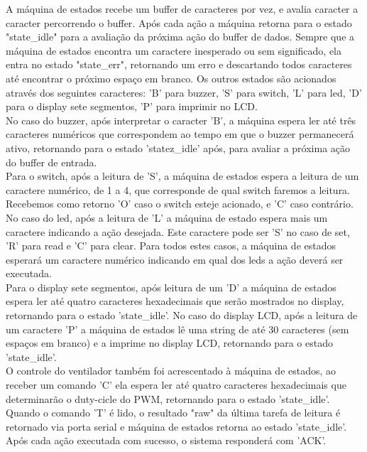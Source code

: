 \documentclass{article}
\begin{document}
A máquina de estados recebe um buffer de caracteres por vez, e avalia caracter a caracter percorrendo o buffer. Após cada ação a máquina retorna para o estado "state\_idle" para a avaliação da próxima ação do buffer de dados. Sempre que a máquina de estados encontra um caractere inesperado ou sem significado, ela entra no estado "state\_err", retornando um erro e descartando todos caracteres até encontrar o próximo espaço em branco. Os outros estados são acionados através dos seguintes caracteres: 'B' para buzzer, 'S' para switch, 'L' para led, 'D' para o display sete segmentos, 'P' para imprimir no LCD.\\
No caso do buzzer,  após interpretar o caracter 'B', a máquina espera ler até três caracteres numéricos que correspondem ao tempo em que o buzzer permanecerá ativo, retornando para o estado 'statez\_idle' após, para avaliar a próxima ação do buffer de entrada.\\
Para o switch, após a leitura de 'S', a máquina de estados espera a leitura de um caractere numérico, de 1 a 4, que corresponde de qual switch faremos a leitura. Recebemos como retorno 'O' caso o switch esteje acionado, e 'C' caso contrário.\\
No caso do led, após a leitura de 'L' a máquina de estado espera mais um caractere indicando a ação desejada. Este caractere pode ser 'S' no caso de set, 'R' para read e 'C' para clear. Para todos estes casos, a máquina de estados esperará um caractere numérico indicando em qual dos leds a ação deverá ser executada.\\
Para o display sete segmentos, após leitura de um 'D' a máquina de estados espera ler até quatro caracteres hexadecimais que serão mostrados no display, retornando para o estado 'state\_idle'.
No caso do display LCD, após a leitura de um caractere 'P' a máquina de estados lê uma string de até 30 caracteres (sem espaços em branco) e a imprime no display LCD, retornando para o estado 'state\_idle'.\\
O controle do ventilador também foi acrescentado à máquina de estados, ao receber um comando 'C' ela espera ler até quatro caracteres hexadecimais que determinarão o duty-cicle do PWM, retornando para o estado 'state\_idle'.\\
Quando o comando 'T' é lido, o resultado "raw" da última tarefa de leitura é retornado via porta serial e máquina de estados retorna ao estado 'state\_idle'.\\
Após cada ação executada com sucesso, o sistema responderá com 'ACK'.
\end{document}
